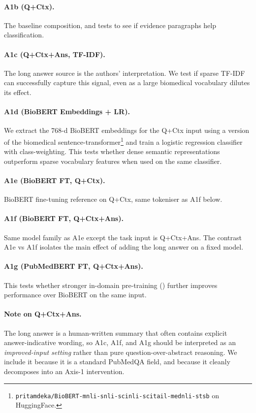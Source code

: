 \documentclass[11pt]{article}
\begin{document}
\paragraph{A1b (Q+Ctx).} The baseline composition, and tests to see if evidence paragraphs help classification.

\paragraph{A1c (Q+Ctx+Ans, TF-IDF).} The long answer source is the authors' interpretation. We test if sparse TF-IDF can successfully capture this signal, even as a large biomedical vocabulary dilutes its effect.

\paragraph{A1d (BioBERT Embeddings + LR).} We extract the 768-d BioBERT embeddings \cite{lee2020biobert} for the Q+Ctx input using a version of the biomedical sentence-transformer\footnote{\texttt{pritamdeka/BioBERT-mnli-snli-scinli-scitail-mednli-stsb} on HuggingFace.} and train a logistic regression classifier with class-weighting. This tests whether dense semantic representations outperform sparse vocabulary features when used on the same classifier.

\paragraph{A1e (BioBERT FT, Q+Ctx).} BioBERT fine-tuning reference on Q+Ctx, same tokeniser as A1f below.

\paragraph{A1f (BioBERT FT, Q+Ctx+Ans).} Same model family as A1e except the task input is Q+Ctx+Ans. The contrast A1e vs A1f isolates the main effect of adding the long answer on a fixed model.

\paragraph{A1g (PubMedBERT FT, Q+Ctx+Ans).} This tests whether stronger in-domain pre-training () further improves performance over BioBERT on the same input.

\paragraph{Note on Q+Ctx+Ans.} The long answer is a human-written summary that often contains explicit answer-indicative wording, so A1c, A1f, and A1g should be interpreted as an \emph{improved-input setting} rather than pure question-over-abstract reasoning. We include it because it is a standard PubMedQA field, and because it cleanly decomposes into an Axis-1 intervention.
\end{document}
